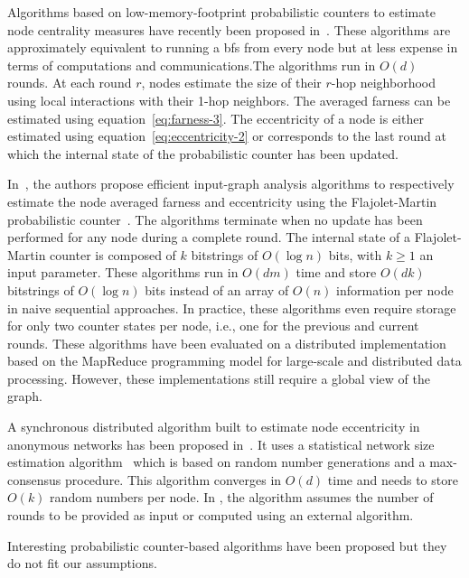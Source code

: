 Algorithms based on low-memory-footprint probabilistic counters to estimate node centrality measures have recently been proposed in~\cite{kang2011hadi,kang2011centralities,garin2012distributed}. These algorithms are approximately equivalent to running a \gls{bfs} from every node but at less expense in terms of computations and communications.The algorithms run in $O(d)$ rounds. At each round $r$, nodes estimate the size of their $r$-hop neighborhood using local interactions with their 1-hop neighbors. The averaged farness can be estimated using equation~\eqref{eq:farness-3}. The eccentricity of a node is either estimated using equation~\eqref{eq:eccentricity-2} or corresponds to the last round at which the internal state of the probabilistic counter has been updated.

In~\cite{kang2011hadi,kang2011centralities}, the authors propose efficient input-graph analysis algorithms to respectively estimate the node averaged farness and eccentricity using the Flajolet-Martin probabilistic counter~\cite{flajolet1985probabilistic}. The algorithms terminate when no update has been performed for any node during a complete round. The internal state of a Flajolet-Martin counter is composed of $k$ bitstrings of $O(\log n)$ bits, with $k \geq 1$ an input parameter. These algorithms run in $O(dm)$ time and store $O(dk)$ bitstrings of $O(\log n)$ bits instead of an array of $O(n)$ information per node in naive sequential approaches. In practice, these algorithms even require storage for only two counter states per node, i.e., one for the previous and current rounds. These algorithms have been evaluated on a distributed implementation based on the MapReduce programming model for large-scale and distributed data processing. However, these implementations still require a global view of the graph.

A synchronous distributed algorithm built to estimate node eccentricity in anonymous networks has been proposed in~\cite{garin2012distributed}. It uses a statistical network size estimation algorithm~\cite{varagnolo2010distributed} which is based on random number generations and a max-consensus procedure. This algorithm converges in $O(d)$ time and needs to store $O(k)$ random numbers per node. In \cite{garin2012distributed}, the algorithm assumes the number of rounds to be provided as input or computed using an external algorithm.

Interesting probabilistic counter-based algorithms have been proposed but they do not fit our assumptions.

